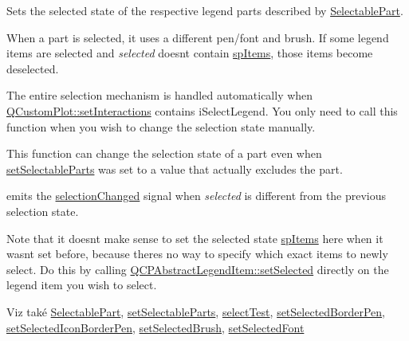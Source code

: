 Sets the selected state of the respective legend parts described by \hyperlink{classQCPLegend_a5404de8bc1e4a994ca4ae69e2c7072f1}{Selectable\+Part}. 

When a part is selected, it uses a different pen/font and brush. If some legend items are selected and {\itshape selected} doesn\textquotesingle{}t contain \hyperlink{classQCPLegend_a5404de8bc1e4a994ca4ae69e2c7072f1a768bfb95f323db4c66473375032c0af7}{sp\+Items}, those items become deselected.

The entire selection mechanism is handled automatically when \hyperlink{classQCustomPlot_a5ee1e2f6ae27419deca53e75907c27e5}{Q\+Custom\+Plot\+::set\+Interactions} contains i\+Select\+Legend. You only need to call this function when you wish to change the selection state manually.

This function can change the selection state of a part even when \hyperlink{classQCPLegend_a9ce60aa8bbd89f62ae4fa83ac6c60110}{set\+Selectable\+Parts} was set to a value that actually excludes the part.

emits the \hyperlink{classQCPLegend_a82c88464edac07a9eefaf3906268df3b}{selection\+Changed} signal when {\itshape selected} is different from the previous selection state.

Note that it doesn\textquotesingle{}t make sense to set the selected state \hyperlink{classQCPLegend_a5404de8bc1e4a994ca4ae69e2c7072f1a768bfb95f323db4c66473375032c0af7}{sp\+Items} here when it wasn\textquotesingle{}t set before, because there\textquotesingle{}s no way to specify which exact items to newly select. Do this by calling \hyperlink{classQCPAbstractLegendItem_a6eed93b0ab99cb3eabb043fb08179c2b}{Q\+C\+P\+Abstract\+Legend\+Item\+::set\+Selected} directly on the legend item you wish to select.

\begin{DoxySeeAlso}{Viz také}
\hyperlink{classQCPLegend_a5404de8bc1e4a994ca4ae69e2c7072f1}{Selectable\+Part}, \hyperlink{classQCPLegend_a9ce60aa8bbd89f62ae4fa83ac6c60110}{set\+Selectable\+Parts}, \hyperlink{classQCPLegend_aa3892801051bc7b985e003576df844db}{select\+Test}, \hyperlink{classQCPLegend_a2c35d262953a25d96b6112653fbefc88}{set\+Selected\+Border\+Pen}, \hyperlink{classQCPLegend_ade93aabe9bcccaf9cf46cec22c658027}{set\+Selected\+Icon\+Border\+Pen}, \hyperlink{classQCPLegend_a875227f3219c9799464631dec5e8f1bd}{set\+Selected\+Brush}, \hyperlink{classQCPLegend_ab580a01c3c0a239374ed66c29edf5ad2}{set\+Selected\+Font} 
\end{DoxySeeAlso}
\hypertarget{classQCPLegend_a7674dfc7a1f30e1abd1018c0ed45e0bc}{}
